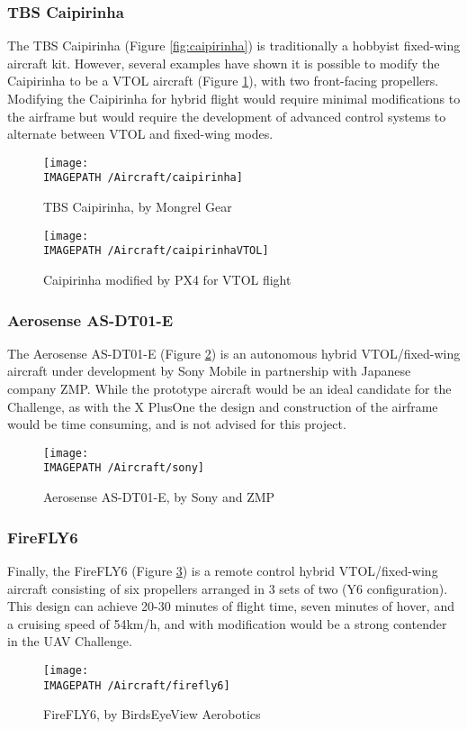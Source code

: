 \subsubsection*{TBS Caipirinha}
The TBS Caipirinha\cite{ref:caipirinha} (Figure \ref{fig:caipirinha}) is traditionally a hobbyist fixed-wing aircraft kit. However, several examples have shown it is possible to modify the Caipirinha to be a VTOL aircraft\cite{ref:caipirinhaVTOL} (Figure \ref{fig:caipirinhaVTOL}), with two front-facing propellers. Modifying the Caipirinha for hybrid flight would require minimal modifications to the airframe but would require the development of advanced control systems to alternate between VTOL and fixed-wing modes.

\begin{figure}[!ht]
	\centering
	\begin{minipage}{.5\textwidth}
		\centering
		\texttt{[image: \\IMAGEPATH /Aircraft/caipirinha]}
		\caption{TBS Caipirinha, by Mongrel Gear}
		\label{fig:caipirinha}
	\end{minipage}%
	\begin{minipage}{.5\textwidth}
		\centering
		\texttt{[image: \\IMAGEPATH /Aircraft/caipirinhaVTOL]}
		\caption{Caipirinha modified by PX4 for VTOL flight}
		\label{fig:caipirinhaVTOL}
	\end{minipage}
\end{figure}

\subsubsection*{Aerosense AS-DT01-E}
The Aerosense AS-DT01-E\cite{ref:sony} (Figure \ref{fig:sony}) is an autonomous hybrid VTOL/fixed-wing aircraft under development by Sony Mobile in partnership with Japanese company ZMP. While the prototype aircraft would be an ideal candidate for the Challenge, as with the X PlusOne the design and construction of the airframe would be time consuming, and is not advised for this project.

\begin{figure}[!ht]
	\centering
	\texttt{[image: \\IMAGEPATH /Aircraft/sony]}
	\caption{Aerosense AS-DT01-E, by Sony and ZMP}
	\label{fig:sony}
\end{figure}

\subsubsection*{FireFLY6}
Finally, the FireFLY6\cite{ref:firefly6} (Figure \ref{fig:firefly6}) is a remote control hybrid VTOL/fixed-wing aircraft consisting of six propellers arranged in 3 sets of two (Y6 configuration). This design can achieve 20-30 minutes of flight time, seven minutes of hover, and a cruising speed of 54km/h, and with modification would be a strong contender in the UAV Challenge.

\begin{figure}[!h]
	\centering
	\texttt{[image: \\IMAGEPATH /Aircraft/firefly6]}
	\caption{FireFLY6, by BirdsEyeView Aerobotics}
	\label{fig:firefly6}
\end{figure}